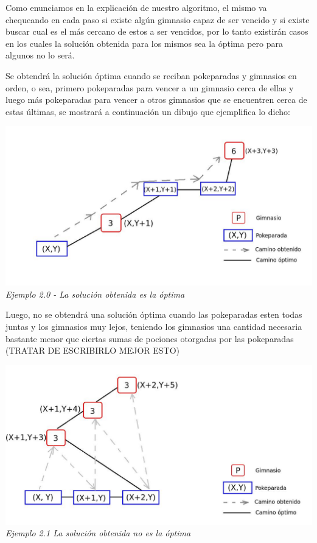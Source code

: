 Como enunciamos en la explicaci\'on de nuestro algoritmo, el mismo va chequeando en cada paso si existe alg\'un gimnasio capaz de ser vencido y si existe buscar cual es el m\'as cercano de estos a ser vencidos, por lo tanto existir\'an casos en los cuales la soluci\'on obtenida para los mismos sea la \'optima pero para algunos no lo ser\'a.

Se obtendr\'a la soluci\'on \'optima cuando se reciban pokeparadas y gimnasios en orden, o sea, primero pokeparadas para vencer a un gimnasio cerca de ellas y luego m\'as pokeparadas para vencer a otros gimnasios que se encuentren cerca de estas \'ultimas, se mostrar\'a a continuaci\'on un dibujo que ejemplifica lo dicho:

\vspace*{0.3cm} \vspace*{0.3cm}
  \begin{center}
\includegraphics[scale=0.60]{./EJ2/optima.jpeg}
\\{\textit{Ejemplo 2.0 - La soluci\'on obtenida es la \'optima}}
  \end{center}
  \vspace*{0.3cm}

Luego, no se obtendr\'a una soluci\'on \'optima cuando las pokeparadas esten todas juntas y los gimnasios muy lejos, teniendo los gimnasios una cantidad necesaria bastante menor que ciertas sumas de pociones otorgadas por las pokeparadas (TRATAR DE ESCRIBIRLO MEJOR ESTO)

\vspace*{0.3cm} \vspace*{0.3cm}
  \begin{center}
\includegraphics[scale=0.60]{./EJ2/nooptima.jpeg}
\\{\textit{Ejemplo 2.1 La soluci\'on obtenida no es la \'optima}}
  \end{center}
  \vspace*{0.3cm}
  
